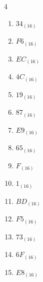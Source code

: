 \begin{multicols}{4}
\begin{enumerate}
        \phantom{$=171$}

  \item $34_{(16)}$

        \phantom{$=52$}

  \item $F6_{(16)}$

        \phantom{$=246$}

  \item $EC_{(16)}$

        \phantom{$=236$}

  \item $4C_{(16)}$

        \phantom{$=76$}

  \item $19_{(16)}$

        \phantom{$=25$}

  \item $87_{(16)}$

        \phantom{$=135$}

  \item $E9_{(16)}$

        \phantom{$=233$}

  \item $65_{(16)}$

        \phantom{$=101$}

  \item $F_{(16)}$

        \phantom{$=15$}

\columnbreak %

  \item $1_{(16)}$

        \phantom{$=1$}

  \item $BD_{(16)}$

        \phantom{$=189$}

  \item $F5_{(16)}$

        \phantom{$=245$}

  \item $73_{(16)}$

        \phantom{$=115$}

  \item $6F_{(16)}$

        \phantom{$=111$}

  \item $E8_{(16)}$

        \phantom{$=232$}


\end{enumerate}
\end{multicols}
